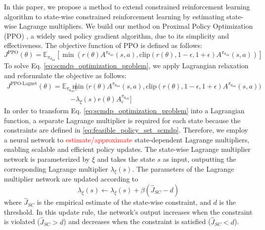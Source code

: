 In this paper, we propose a method to extend constrained reinforcement learning algorithm to state-wise constrained reinforcement learning by estimating state-wise Lagrange multipliers.
We build our method on Proximal Policy Optimization (PPO) \cite{schulman2017proximal}, a widely used policy gradient algorithm, due to its simplicity and effectiveness.
The objective function of PPO is defined as follows:
\begin{equation} 
    J^{\text{PPO}}(\theta) = \mathbb{E}_{\pi_{\theta_\text{old}}} \left[ \min \left( r(\theta) A^{\pi_{\theta_\text{old}}}(s, a), \text{clip}(r(\theta), 1 - \epsilon, 1 + \epsilon) A^{\pi_{\theta_\text{old}}}(s, a) \right) \right] 
\end{equation}
To solve Eq. \eqref{eq:scmdp_optimization_problem}, we apply Lagrangian relaxation and reformulate the objective as follows:
\begin{equation} 
    \begin{aligned} J^{\text{PPO-Lagnet}}(\theta) 
        = \mathbb{E}_{\pi_{\theta_\text{old}}} \Big[ &\min \big( r(\theta) A^{\pi_{\theta_\text{old}}}(s, a), \text{clip}(r(\theta), 1 - \epsilon, 1 + \epsilon) A^{\pi_{\theta_\text{old}}}(s, a) \big) 
        \\ &- \lambda_\xi(s) r(\theta) A^{\pi_{\theta_\text{old}}}_c \Big] 
    \end{aligned} 
\end{equation}
In order to transform Eq. \eqref{eq:scmdp_optimization_problem} into a Lagrangian function, a separate Lagrange multiplier is required for each state because the constraints are defined in \eqref{eq:feasible_policy_set_scmdp}.
Therefore, we employ a neural network to \textcolor{red}{estimate/approximate} state-dependent Lagrange multipliers, enabling scalable and efficient policy updates.
The state-wise Lagrange multiplier network is parameterized by $\xi$ and takes the state $s$ as input, outputting the corresponding Lagrange multiplier $\lambda_\xi(s)$.
The parameters of the Lagrange multiplier network are updated according to
\begin{equation}
    \lambda_\xi(s) \leftarrow \lambda_\xi(s) + \beta(\hat{J}_{SC} - d)
\end{equation}
where $\hat{J}_{SC}$ is the empirical estimate of the state-wise constraint, and $d$ is the threshold.
In this update rule, the network's output increases when the constraint is violated ($\hat{J}_{SC} > d$) and decreases when the constraint is satisfied ($\hat{J}_{SC} < d$).